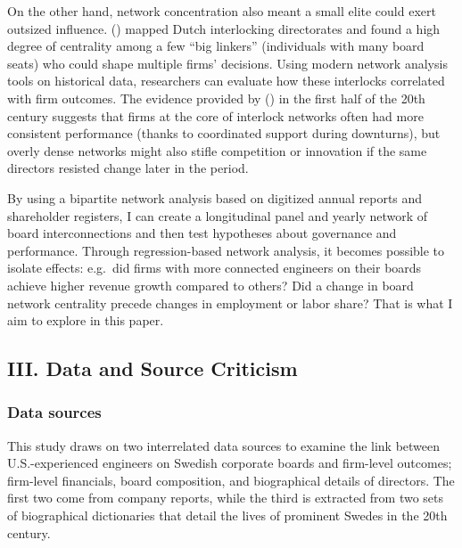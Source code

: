 \documentclass[
]{article}
\begin{document}
On the other hand, network concentration also meant a small elite could
exert outsized influence.
()
mapped Dutch interlocking directorates and found a high degree of
centrality among a few ``big linkers'' (individuals with many board
seats) who could shape multiple firms' decisions. Using modern network
analysis tools on historical data, researchers can evaluate how these
interlocks correlated with firm outcomes. The evidence provided by
()
in the first half of the 20th century suggests that firms at the core of
interlock networks often had more consistent performance (thanks to
coordinated support during downturns), but overly dense networks might
also stifle competition or innovation if the same directors resisted
change later in the period.

By using a bipartite network analysis based on digitized annual reports
and shareholder registers, I can create a longitudinal panel and yearly
network of board interconnections and then test hypotheses about
governance and performance\hspace{0pt}. Through regression-based network
analysis, it becomes possible to isolate effects: e.g.~did firms with
more connected engineers on their boards achieve higher revenue growth
compared to others? Did a change in board network centrality precede
changes in employment or labor share? That is what I aim to explore in
this paper.

\subsection{III. Data and Source
Criticism}\label{iii.-data-and-source-criticism-1}

\subsubsection{Data sources}\label{data-sources}

This study draws on two interrelated data sources to examine the link
between U.S.-experienced engineers on Swedish corporate boards and
firm-level outcomes; firm-level financials, board composition, and
biographical details of directors. The first two come from company
reports, while the third is extracted from two sets of biographical
dictionaries that detail the lives of prominent Swedes in the 20th
century.
\end{document}
